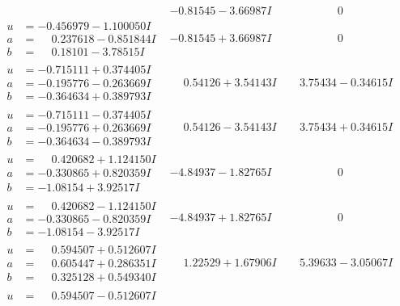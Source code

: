 \documentclass[1p]{elsarticle_modified}
\theoremstyle{definition}
\begin{document}
$$\begin{array}{c|c|c}
 & -0.81545 - 3.66987 I & \phantom{-0.000000 } 0 \\ \hline\begin{aligned}
u &= -0.456979 - 1.100050 I \\
a &= \phantom{-}0.237618 - 0.851844 I \\
b &= \phantom{-}0.18101 - 3.78515 I\end{aligned}
 & -0.81545 + 3.66987 I & \phantom{-0.000000 } 0 \\ \hline\begin{aligned}
u &= -0.715111 + 0.374405 I \\
a &= -0.195776 - 0.263669 I \\
b &= -0.364634 + 0.389793 I\end{aligned}
 & \phantom{-}0.54126 + 3.54143 I & \phantom{-}3.75434 - 0.34615 I \\ \hline\begin{aligned}
u &= -0.715111 - 0.374405 I \\
a &= -0.195776 + 0.263669 I \\
b &= -0.364634 - 0.389793 I\end{aligned}
 & \phantom{-}0.54126 - 3.54143 I & \phantom{-}3.75434 + 0.34615 I \\ \hline\begin{aligned}
u &= \phantom{-}0.420682 + 1.124150 I \\
a &= -0.330865 + 0.820359 I \\
b &= -1.08154 + 3.92517 I\end{aligned}
 & -4.84937 - 1.82765 I & \phantom{-0.000000 } 0 \\ \hline\begin{aligned}
u &= \phantom{-}0.420682 - 1.124150 I \\
a &= -0.330865 - 0.820359 I \\
b &= -1.08154 - 3.92517 I\end{aligned}
 & -4.84937 + 1.82765 I & \phantom{-0.000000 } 0 \\ \hline\begin{aligned}
u &= \phantom{-}0.594507 + 0.512607 I \\
a &= \phantom{-}0.605447 + 0.286351 I \\
b &= \phantom{-}0.325128 + 0.549340 I\end{aligned}
 & \phantom{-}1.22529 + 1.67906 I & \phantom{-}5.39633 - 3.05067 I \\ \hline\begin{aligned}
u &= \phantom{-}0.594507 - 0.512607 I \\

\end{aligned}
\end{array}$$
\end{document}
